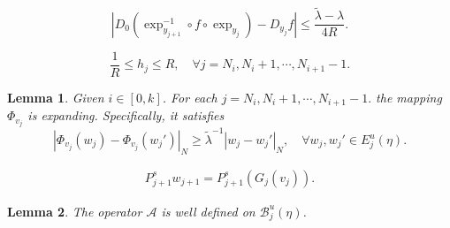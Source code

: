 \documentclass[10pt,a4paper]{amsart}
\newtheorem{lemma}{Lemma}
\begin{document}
	\begin{equation}\label{3.2}\left| D_0 (\exp_{y_{j+1}}^{-1} \circ f \circ \exp_{y_j}) - D_{y_j} f\right| \leqslant \frac{\widetilde{\lambda} - \lambda}{4R}.
	\end{equation}

	\begin{equation}\label{3.4} \frac{1}{R}\leqslant h_{j}\leqslant R,\quad\forall j=N_{i},N_{i}+1,\cdots,N_{i+1}-1.
	\end{equation}

	\begin{lemma}\label{lem:3.2} Given $ i\in [0,k] $. For each $j=N_{i},N_{i}+1,\cdots,N_{i+1}-1.$ the mapping $\Phi_{v_j}$ is expanding. Specifically, it satisfies
		$$|\Phi_{v_j}(w_j) - \Phi_{v_j}(w_j')|_N \geqslant \widetilde{\lambda}^{-1} |w_j - w_j'|_N, \quad \forall w_j, w_j' \in E_{j}^u(\eta).$$ 
	\end{lemma}

	\begin{align}\label{3.7}
		P_{j+1}^{s}w_{j+1}=P_{j+1}^{s}(G_{j}(v_{j})).
	\end{align}

	\begin{lemma}\label{lem:3.3} 	The operator $ \mathcal{A} $ is well defined on $ \mathcal{B}_{j}^{u}(\eta) $.
	\end{lemma}
\end{document}
